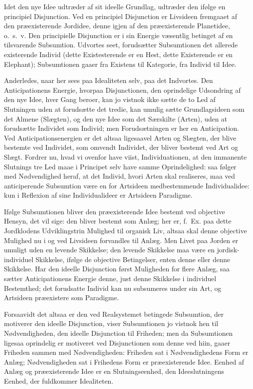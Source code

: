 \documentclass[12pt]{book}
\newcommand{\opage}[1]{\marginnote{\footnotesize\textit{[#1]}}}
\begin{document}
Idet den nye Idee udtræder af sit ideelle Grundlag, udtræder den ifølge en principiel Disjunction. Ved en principiel Disjunction er Livsideen fremgaaet af den præexisterende
\opage{449}Jordidee, denne igjen af den præexisterende Planetidee, o.\ s.\ v. Den principielle Disjunction er i sin Energie væsentlig betinget af en tilsvarende Subsumtion. Udvortes seet, forudsætter Subsumtionen det allerede existerende Individ (dette Existesterende er en Hest, dette Existerende er en Elephant); Subsumtionen gaaer fra Existens til Kategorie, fra Individ til Idee.

Anderledes, naar her sees paa Idealiteten selv, paa det Indvortes. Den Anticipationens Energie, hvorpaa Disjunctionen, den oprindelige Udsondring af den nye Idee, hver Gang beroer, kan jo vistnok ikke sætte de to Led af Slutningen uden at forudsætte det tredie, kan umulig sætte Grundlagsideen som det Almene (Slægten), og den nye Idee som det Særskilte (Arten), uden at forudsætte Individet som Individ; men Forudsætningen er her en Anticipation. Ved Anticipationsenergien er det altsaa ligesaavel Arten og Slægten, der blive bestemte ved Individet, som omvendt Individet, der bliver bestemt ved Art og Slægt. Fordrer nu, hvad vi ovenfor have viist, Individuationen, at den immanente Slutnings tre Led maae i Principet selv have samme Oprindelighed: saa følger med Nødvendighed heraf, at det Individ, hvori Arten skal realiseres, maa ved anticiperende Subsumtion være en for Artsideen medbestemmende Individualidee: kun i Reflexion af sine Individualideer er Artsideen Paradigme.

Ifølge Subsumtionen bliver den præexisterende Idee bestemt ved objective Hensyn, det vil sige: den bliver bestemt som Anlæg; her er, f.\ Ex. paa dette Jordklodens Udviklingstrin Mulighed til organisk Liv, altsaa skal denne objective Mulighed nu i og ved Livsideen forvandles til Anlæg. Men Livet paa Jorden er umuligt uden en levende Skikkelse; den levende Skikkelse maa være en jordisk-individuel Skikkelse, ifølge de objective Betingelser, enten denne eller denne Skikkelse. Har den ideelle Disjunction først Muligheden for flere Anlæg, saa sætter Anticipationens Energie denne, just denne
\opage{450}Skikkelse i individuel Bestemthed; det forudsatte Individ kan nu subsumeres under sin Art, og Artsideen præexistere som Paradigme.

Forsaavidt det altsaa er den ved Realsystemet betingede Subsumtion, der motiverer den ideelle Disjunction, viser Subsumtionen jo vistnok hen til Nødvendigheden, den ideelle Disjunction til Friheden; men da Subsumtionen ligesaa oprindelig er motiveret ved Disjunctionen som denne ved hiin, gaaer Friheden sammen med Nødvendigheden: Friheden sat i Nødvendighedens Form er Anlæg; Nødvendigheden sat i Frihedens Form er præexisterende Idee. Eenhed af Anlæg og præexisterende Idee er en Slutningseenhed, den Ideeslutningens Eenhed, der fuldkommer Idealiteten.
\end{document}
